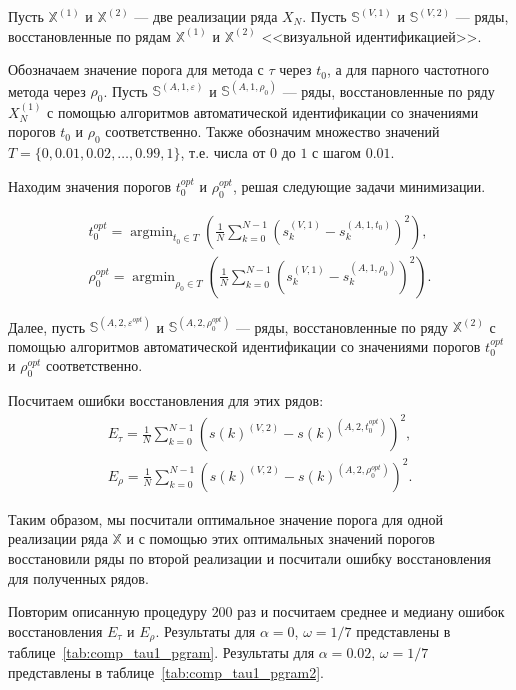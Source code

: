 \documentclass[specialist,
               substylefile = spbu.rtx,
               subf,href,colorlinks=true, 12pt]{disser}
\def\argmin{\mathop{\mathrm{argmin}}}
\begin{document}
{{Пусть $\mathbb{X}^{(1)}$ и $\mathbb{X}^{(2)}$ --- две реализации ряда $X_N$. 
Пусть $\mathbb{S}^{(V,1)}$ и  $\mathbb{S}^{(V,2)}$ --- ряды, восстановленные по рядам $\mathbb{X}^{(1)}$ и $\mathbb{X}^{(2)}$ <<визуальной идентификацией>>.

Обозначаем значение порога для метода с $\tau$ через $t_0$, а для парного частотного метода через $\rho_0$. 
Пусть $\mathbb{S}^{(A,1,\varepsilon)}$ и  $\mathbb{S}^{(A,1, \rho_0)}$ --- ряды, восстановленные по ряду $X_N^{(1)}$  с помощью алгоритмов автоматической идентификации со значениями порогов $t_0$ и $\rho_0$ соответственно.
Также обозначим множество значений $T = \{0,0.01,0.02,\ldots, 0.99,1\}$, т.е. числа от $0$ до $1$ с шагом $0.01$.

Находим значения порогов $t_0^{opt}$ и $\rho_0^{opt}$, решая следующие задачи минимизации.

\begin{gather*}
t_0^{opt} = \argmin_{t_0 \in T}{\left(\frac{1}{N}\sum_{k=0}^{N-1}{\left(s_k^{(V,1)} - s_k^{(A,1,t_0)}\right)}^2\right)}, \\
\rho_0^{opt} = \argmin_{\rho_0 \in T}{\left(\frac{1}{N}\sum_{k=0}^{N-1}{\left(s_k^{(V,1)} - s_k^{(A,1,\rho_0)}\right)}    ^2\right)}.
\end{gather*}

Далее, пусть  $\mathbb{S}^{(A,2,\varepsilon^{opt})}$ и  $\mathbb{S}^{(A,2, \rho_0^{opt})}$ --- ряды, восстановленные по ряду $\mathbb{X}^{(2)}$  с помощью алгоритмов автоматической идентификации со значениями порогов $t_0^{opt}$ и $\rho_0^{opt}$ соответственно.

Посчитаем ошибки восстановления для этих рядов:
\begin{gather*}
E_{\tau} = \frac{1}{N}\sum_{k=0}^{N-1}{\left(s(k)^{(V,2)} - s(k)^{(A,2,t_0^{opt})}\right)^2}, \\
E_{\rho} = \frac{1}{N}\sum_{k=0}^{N-1}{\left(s(k)^{(V,2)} - s(k)^{(A,2,\rho_0^{opt})}\right)^2}.
\end{gather*}

Таким образом, мы посчитали оптимальное значение порога для одной реализации ряда $\mathbb{X}$ и с помощью этих оптимальных значений порогов восстановили ряды по второй реализации и посчитали ошибку восстановления для полученных рядов.

Повторим описанную процедуру $200$ раз и посчитаем среднее и медиану ошибок восстановления $E_{\tau}$ и $E_{\rho}$. Результаты для $\alpha = 0$, $\omega = 1/7$ представлены в таблице~\ref{tab:comp_tau1_pgram}. Результаты для $\alpha = 0.02$, $\omega = 1/7$ представлены в таблице~\ref{tab:comp_tau1_pgram2}.

}}
\end{document}
